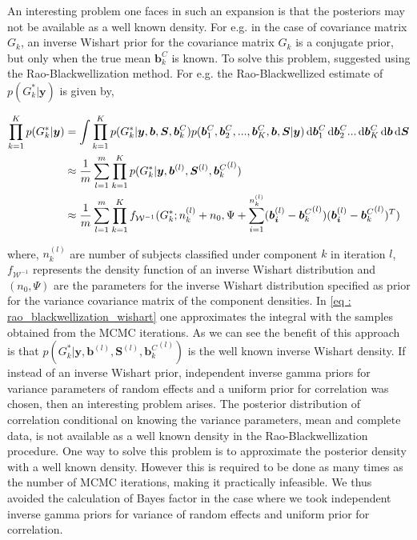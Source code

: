 An interesting problem one faces in such an expansion is that the posteriors may not be available as a well known density. For e.g. in the case of covariance matrix $G_k$, an inverse Wishart prior for the covariance matrix $G_k$ is a conjugate prior, but only when the true mean $\boldsymbol{b}_k^C$ is known. To solve this problem, \citet{chib_marginal_1995} suggested using the Rao-Blackwellization method. For e.g. the Rao-Blackwellized estimate of $p(G_k^*|\boldsymbol{y})$ is given by,

\begin{equation}
\label{eq : rao_blackwellization_wishart}
\begin{split}
\prod_{k=1}^K p(G_k^*|\boldsymbol{y}) & = \int \prod_{k=1}^{K} p(G_k^*| \boldsymbol{y}, \boldsymbol{b}, \boldsymbol{S}, \boldsymbol{b}_k^C) p(\boldsymbol{b}_1^C, \boldsymbol{b}_2^C,..., \boldsymbol{b}_K^C,\boldsymbol{b}, \boldsymbol{S}|\boldsymbol{y}) 
\mathop{}\!\mathrm{d}{\boldsymbol{b}_1^C} \mathop{}\!\mathrm{d}{\boldsymbol{b}_2^C} ... \mathop{}\!\mathrm{d}{\boldsymbol{b}_K^C} \mathop{}\!\mathrm{d}{\boldsymbol{b}} \mathop{}\!\mathrm{d}{\boldsymbol{S}}\\
& \approx \frac 1 m \sum_{l=1}^m \prod_{k=1}^{K} p(G_k^*| \boldsymbol{y}, \boldsymbol{b}^{(l)}, \boldsymbol{S}^{(l)}, {\boldsymbol{b}_k^C}^{(l)
})\\
& \approx \frac 1 m \sum_{l=1}^m \prod_{k=1}^{K} f_{\mathcal{W}^{-1}}(G_k^*; n_k^{(l)}+n_0, \Psi + \sum_{i=1}^{n_k^{(l)}}(\boldsymbol{b_i}^{(l)} - {\boldsymbol{b}_k^C}^{(l)})(\boldsymbol{b_i}^{(l)} - {\boldsymbol{b}_k^C}^{(l)})^T)
\end{split}
\end{equation}

where, $n_k^{(l)}$ are number of subjects classified under component $k$ in iteration $l$, $f_{\mathcal{W}^{-1}}$ represents the density function of an inverse Wishart distribution and $(n_0, \Psi)$ are the parameters for the inverse Wishart distribution specified as prior for the variance covariance matrix of the component densities. In \ref{eq : rao_blackwellization_wishart} one approximates the integral with the samples obtained from the MCMC iterations. As we can see the benefit of this approach is that $p(G_k^*| \boldsymbol{y}, \boldsymbol{b}^{(l)}, \boldsymbol{S}^{(l)}, {\boldsymbol{b}_k^C}^{(l)})$ is the well known inverse Wishart density. If instead of an inverse Wishart prior, independent inverse gamma priors for variance parameters of random effects and a uniform prior for correlation was chosen, then an interesting problem arises. The posterior distribution of correlation conditional on knowing the variance parameters, mean and complete data, is not available as a well known density in the Rao-Blackwellization procedure. One way to solve this problem is to approximate the posterior density with a well known density. However this is required to be done as many times as the number of MCMC iterations, making it practically infeasible. We thus avoided the calculation of Bayes factor in the case where we took independent inverse gamma priors for variance of random effects and uniform prior for correlation.\\

